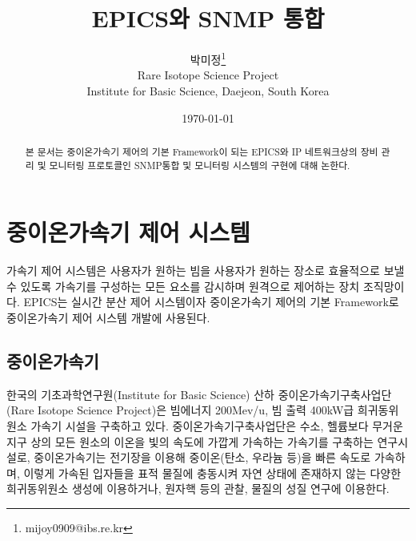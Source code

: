 \documentclass[11pt
  , a4paper
  , article
  , oneside
]{memoir}
\begin{document}
 
\newcommand{\technumber}{
  RAON Control-Document Series\\
  Revision : v0.1,   Release : Mar. 12. 2015}
\title{\textbf{EPICS와 SNMP 통합}}

\author{박미정\thanks{mijoy0909@ibs.re.kr} \\

  Rare Isotope Science Project\\
  Institute for Basic Science, Daejeon, South Korea
}
\date{\today}


\renewcommand{\maketitlehooka}{\begin{flushright}\textsf{\technumber}\end{flushright}}

\maketitle

\begin{abstract}
본 문서는 중이온가속기 제어의 기본 Framework이 되는 EPICS와 IP 네트워크상의 장비 관리 및 모니터링 프로토콜인 SNMP통합 및 모니터링 시스템의 구현에 대해 논한다.
\end{abstract}

\chapter{중이온가속기 제어 시스템}
가속기 제어 시스템은 사용자가 원하는 빔을 사용자가 원하는 장소로 효율적으로 보낼 수 있도록 가속기를 구성하는 모든 요소를 감시하며 원격으로 제어하는 장치 조직망이다. EPICS는 실시간 분산 제어 시스템이자 중이온가속기 제어의 기본 Framework로 중이온가속기 제어 시스템 개발에 사용된다. 

\section{중이온가속기}
한국의 기초과학연구원(Institute for Basic Science) 산하 중이온가속기구축사업단(Rare Isotope Science Project)은 빔에너지 200Mev/u, 빔 출력 400kW급 희귀동위 원소 가속기 시설을 구축하고 있다. 중이온가속기구축사업단은 수소, 헬륨보다 무거운 지구 상의 모든 원소의 이온을 빛의 속도에 가깝게 가속하는 가속기를 구축하는 연구시설로, 중이온가속기는 전기장을 이용해 중이온(탄소, 우라늄 등)을 빠른 속도로 가속하며, 이렇게 가속된 입자들을 표적 물질에 충동시켜 자연 상태에 존재하지 않는 다양한 희귀동위원소 생성에 이용하거나, 원자핵 등의 관찰, 물질의 성질 연구에 이용한다\citep{raon}\citep{risp}. 
\end{document}
